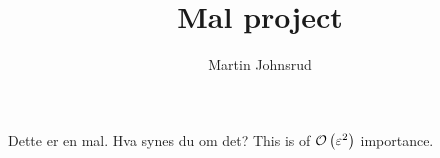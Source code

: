 \documentclass{article}
\title{Mal project}
\author{Martin Johnsrud}
\date{}
\begin{document}
    \maketitle
    Dette er en mal.\cite{mojahed} Hva synes du om det?
    This is of $\Oh[2]{\eps}$ importance.

    \printbibliography
\end{document}
